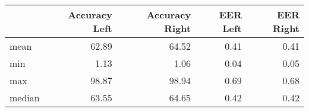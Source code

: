 \begin{tabular}{lrrrr}
\toprule
{} &  Accuracy Left &  Accuracy Right &  EER Left &  EER Right \\
\midrule
mean   &          62.89 &           64.52 &      0.41 &       0.41 \\
min    &           1.13 &            1.06 &      0.04 &       0.05 \\
max    &          98.87 &           98.94 &      0.69 &       0.68 \\
median &          63.55 &           64.65 &      0.42 &       0.42 \\
\bottomrule
\end{tabular}
